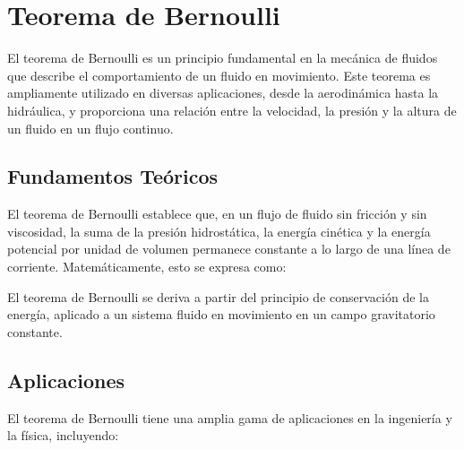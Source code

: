 \documentclass[../main]{subfiles}
\begin{document}
\section{Teorema de Bernoulli}

El teorema de Bernoulli es un principio fundamental en la mecánica de fluidos que describe el comportamiento de un fluido en movimiento. Este teorema es ampliamente utilizado en diversas aplicaciones, desde la aerodinámica hasta la hidráulica, y proporciona una relación entre la velocidad, la presión y la altura de un fluido en un flujo continuo.

\subsection{Fundamentos Teóricos}

El teorema de Bernoulli establece que, en un flujo de fluido sin fricción y sin viscosidad, la suma de la presión hidrostática, la energía cinética y la energía potencial por unidad de volumen permanece constante a lo largo de una línea de corriente. Matemáticamente, esto se expresa como:


El teorema de Bernoulli se deriva a partir del principio de conservación de la energía, aplicado a un sistema fluido en movimiento en un campo gravitatorio constante.

\subsection{Aplicaciones}

El teorema de Bernoulli tiene una amplia gama de aplicaciones en la ingeniería y la física, incluyendo:
\end{document}
